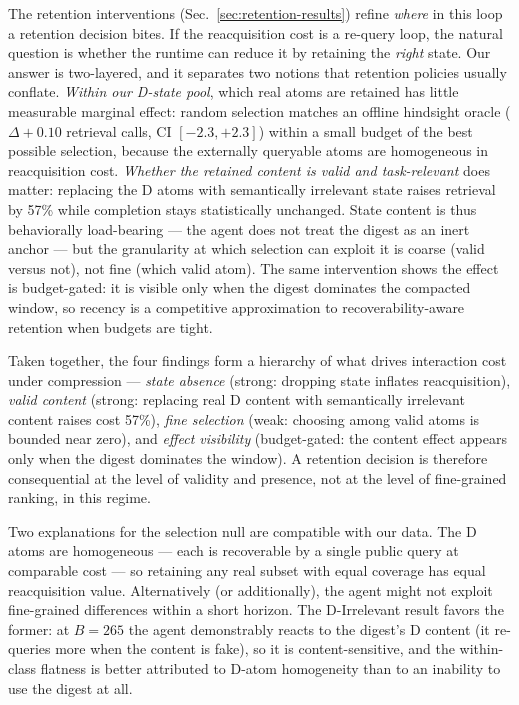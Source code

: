 \documentclass[11pt]{article}
\begin{document}
The retention interventions (Sec.~\ref{sec:retention-results}) refine \emph{where} in this loop a retention decision
bites. If the reacquisition cost is a re-query loop, the natural question is whether the
runtime can reduce it by retaining the \emph{right} state. Our answer is two-layered, and it
separates two notions that retention policies usually conflate. \emph{Within our D-state
pool}, which real atoms are retained has little measurable marginal effect: random
selection matches an offline hindsight oracle
($\Delta +0.10$ retrieval calls, CI $[-2.3, +2.3]$) within a small budget of the best possible
selection, because the externally queryable atoms are homogeneous in reacquisition cost.
\emph{Whether the retained content is valid and task-relevant} does matter: replacing the D
atoms with semantically irrelevant state raises retrieval by 57\% while completion stays
statistically unchanged. State content is thus behaviorally load-bearing --- the agent does
not treat the digest as an inert anchor --- but the granularity at which selection can
exploit it is coarse (valid versus not), not fine (which valid atom). The same
intervention shows the effect is budget-gated: it is visible only when the digest
dominates the compacted window, so recency is a competitive approximation to
recoverability-aware retention when budgets are tight.

Taken together, the four findings form a hierarchy of what drives interaction cost under
compression --- \emph{state absence} (strong: dropping state inflates reacquisition), \emph{valid
content} (strong: replacing real D content with semantically irrelevant content raises
cost 57\%), \emph{fine selection} (weak: choosing among valid atoms is bounded near zero), and
\emph{effect visibility} (budget-gated: the content effect appears only when the digest
dominates the window). A retention decision is therefore consequential at the level of
validity and presence, not at the level of fine-grained ranking, in this regime.

Two explanations for the selection null are compatible with our data. The D atoms are
homogeneous --- each is recoverable by a single public query at comparable cost --- so
retaining any real subset with equal coverage has equal reacquisition value. Alternatively
(or additionally), the agent might not exploit fine-grained differences within a short
horizon. The D-Irrelevant result favors the former: at $B=265$ the agent demonstrably
reacts to the digest's D content (it re-queries more when the content is fake), so it is
content-sensitive, and the within-class flatness is better attributed to D-atom
homogeneity than to an inability to use the digest at all.
\end{document}
